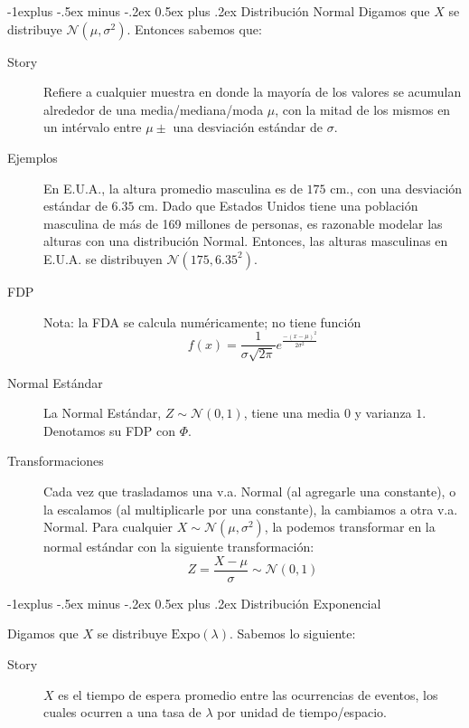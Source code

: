 \documentclass[12,landscape]{article}
\makeatletter
\newcommand{\N}{\mathcal{N}}
\newcommand{\Expo}{\textrm{Expo}}
\renewcommand{\subsection}{\@startsection{subsection}{2}{0mm}%
                                {-1explus -.5ex minus -.2ex}%
                                {0.5ex plus .2ex}%
                                {\normalfont\normalsize\bfseries}}
\makeatother
\begin{document}
\begin{multicols*}{3}
\subsection{Distribución Normal} Digamos que $X$ se distribuye $\N(\mu, \sigma^2)$. Entonces sabemos que:
\begin{description}
    \item[Story] Refiere a cualquier muestra en donde la mayoría de los valores se acumulan alrededor de una media/mediana/moda $\mu$, con la mitad de los mismos en un intérvalo entre $\mu \pm$ una desviación estándar de $\sigma$.
    \item[Ejemplos] En E.U.A., la altura promedio masculina es de $175$ cm., con una desviación estándar de $6.35$ cm. Dado que Estados Unidos tiene una población masculina de más de 169 millones de personas, es razonable modelar las alturas con una distribución Normal. Entonces, las alturas masculinas en E.U.A. se distribuyen $\N(175,6.35^2)$.
    \item[FDP] Nota: la FDA se calcula numéricamente; no tiene función
        \[f(x) = \frac{1}{\sigma \sqrt{2 \pi}} e^{\frac{-(x - \mu)^2}{2\sigma^2}}\] 
    \item[Normal Estándar] La Normal Estándar, $Z \sim \N(0, 1)$, tiene una media $0$ y varianza $1$. Denotamos su FDP con $\Phi$.
    \item[Transformaciones] Cada vez que trasladamos una v.a. Normal (al agregarle una constante), o la escalamos (al multiplicarle por una constante), la cambiamos a otra v.a. Normal. Para cualquier $X \sim \N(\mu, \sigma^2)$, la podemos transformar en la normal estándar con la siguiente transformación:
    \[Z= \frac{X - \mu}{\sigma} \sim \N(0, 1) \]
\end{description}

\subsection{Distribución Exponencial}

Digamos que $X$ se distribuye $\Expo(\lambda)$. Sabemos lo siguiente:

\begin{description}

    \item[Story] $X$ es el tiempo de espera promedio entre las ocurrencias de eventos, los cuales ocurren a una tasa de $\lambda$ por unidad de tiempo/espacio.
    

\end{description}
\end{multicols*}
\end{document}
